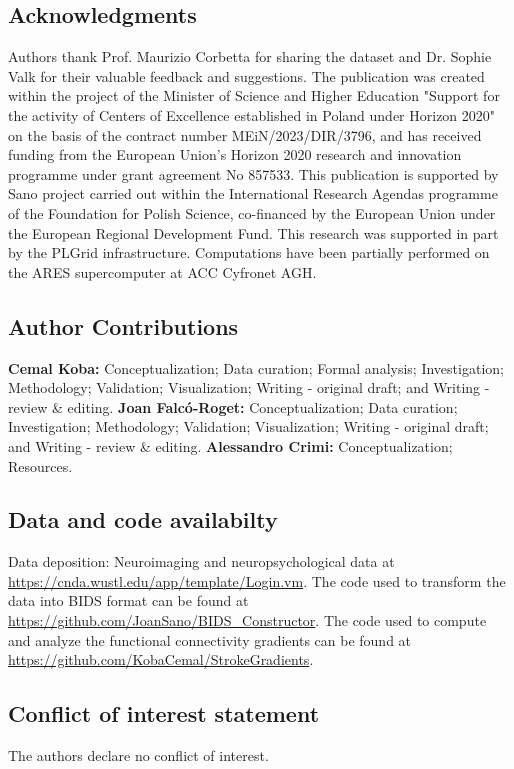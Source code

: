 \documentclass[fleqn,10pt]{wlscirep}
\begin{document}
\subsection*{Acknowledgments}
Authors thank Prof. Maurizio Corbetta for sharing the dataset and Dr. Sophie Valk for their valuable feedback and suggestions.  The publication was created within the project of the Minister of Science and Higher Education "Support for the activity of Centers of Excellence established in Poland under Horizon 2020" on the basis of the contract number MEiN/2023/DIR/3796, and has received funding from the European Union’s Horizon 2020 research and innovation programme under grant agreement No 857533. This publication is supported by Sano project carried out within the International Research Agendas programme of the Foundation for Polish Science, co-financed by the European Union under the European Regional Development Fund. This research was supported in part by the PLGrid infrastructure. Computations have been partially performed on the ARES supercomputer at ACC Cyfronet AGH. 


\subsection*{Author Contributions}
\textbf{Cemal Koba:} Conceptualization; Data curation; Formal analysis; Investigation; Methodology; Validation; Visualization; Writing - original draft; and Writing - review \& editing. \textbf{Joan Falc\'o-Roget:} Conceptualization;  Data curation; Investigation; Methodology; Validation; Visualization; Writing - original draft; and Writing - review \& editing. \textbf{Alessandro Crimi:} Conceptualization; Resources.

\subsection*{Data and code availabilty}
Data deposition: Neuroimaging and neuropsychological data at \href{https://cnda.wustl.edu/app/template/Login.vm}{https://cnda.wustl.edu/app/template/Login.vm}. The code used to transform the data into BIDS format can be found at \href{https://github.com/JoanSano/BIDS_Constructor}{https://github.com/JoanSano/BIDS\_Constructor}. The code used to compute and analyze the functional connectivity gradients can be found at \href{https://github.com/KobaCemal/StrokeGradients}{https://github.com/KobaCemal/StrokeGradients}. 

\subsection*{Conflict of interest statement}
The authors declare no conflict of interest.
\end{document}
